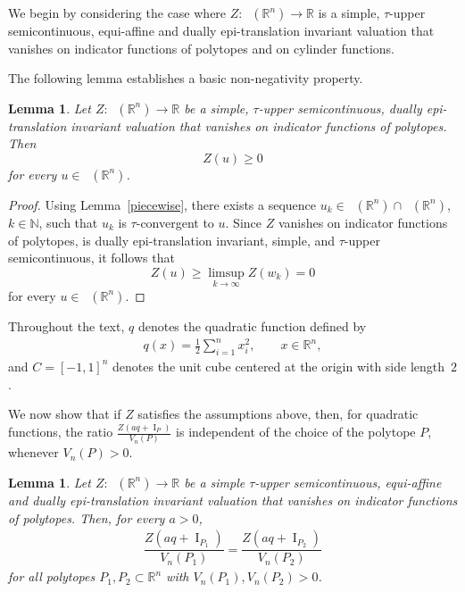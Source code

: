 \documentclass[11pt]{article}
\newtheorem{lema}[teo]{Lemma}
\theoremstyle{definition} %
\newcommand{\RR}{(\mathbb{R}^n)}
\DeclareMathOperator{\I}{I}
\DeclareMathOperator{\PA}{Conv_{p.a}}
\DeclareMathOperator{\LP}{Conv_{lp}}
\begin{document}
We begin by considering the case where
$Z:\LP\RR\rightarrow\mathbb{R}$ is a simple,
$\tau$-upper semicontinuous, equi-affine and dually epi-translation invariant valuation that vanishes on indicator functions of polytopes and on cylinder functions.






The following lemma establishes a basic non-negativity property.

\begin{lema}\label{non-negative}
Let $Z:\LP(\mathbb{R}^n)\to\mathbb{R}$ be a simple, $\tau$-upper semicontinuous, dually epi-translation invariant valuation that vanishes on indicator functions of polytopes. Then
\[
Z(u)\ge0
\]
for every $u\in\LP(\mathbb{R}^n)$.
\end{lema}

\begin{proof}
Using Lemma~\ref{piecewise}, there exists a sequence
$u_k\in\PA(\mathbb{R}^n)\cap\LP(\mathbb{R}^n)$, $k\in\mathbb{N}$, such that  $u_k$ is $\tau$-convergent to $u$. Since $Z$ vanishes on indicator functions of polytopes, is dually epi-translation invariant, simple, and $\tau$-upper semicontinuous, it follows that
\[
Z(u)\ge \limsup_{k\to \infty} Z(w_k)=0
\]
for every $u\in\LP(\mathbb{R}^n)$.
\end{proof}




Throughout the text, $q$ denotes the quadratic function defined by
\begin{align}\label{q}
    q(x)=\frac{1}{2}\sum_{i=1}^nx_i^2, \qquad x\in\mathbb{R}^n,
\end{align}  
and $C = [-1,1]^n$ denotes the unit cube centered at the origin with side length~$2$.

We now show that if $Z$ satisfies the assumptions above, then, for quadratic functions, the ratio $\frac{Z(aq+\I_P)}{V_n(P)}$ is independent of the choice of the polytope $P$, whenever $V_n(P)>0$.

\begin{lema}
Let $Z:\LP\RR\rightarrow\mathbb{R}$ be a simple $\tau$-upper semicontinuous, equi-affine and  dually epi-translation   invariant valuation that   vanishes on  indicator functions of polytopes. Then, for every $a>0$, 
\begin{align}\label{mudanca_dominio}
 \dfrac{Z(aq+\I_{P_1})}{V_n(P_1)}= \dfrac{Z(aq+\I_{P_2})}{V_n(P_2)}   
\end{align}
for all polytopes $P_1,P_2\subset\mathbb{R}^n$ with $V_n(P_1),V_n(P_2)>0$.
\end{lema}
\end{document}
